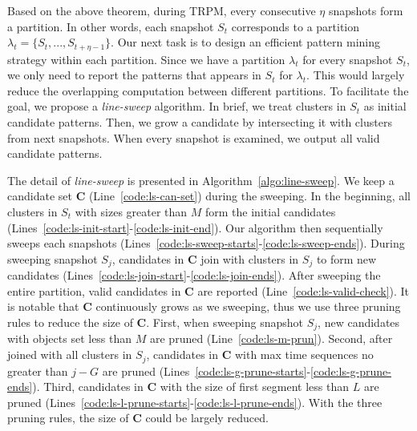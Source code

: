 Based on the above theorem, during TRPM, every consecutive $\eta$ snapshots
form a partition. In other words, each snapshot $S_t$ corresponds to a partition $\lambda_t=\{S_t,...,S_{t+\eta-1}\}$. 
Our next task is to design an efficient pattern mining strategy within each partition. 
Since we have a partition $\lambda_t$ for every snapshot $S_t$,
we only need to report the patterns that appears in $S_t$ for $\lambda_t$. This would largely
reduce the overlapping computation between different partitions. To facilitate the goal,
%
%
%
we propose a \emph{line-sweep} algorithm. In brief, we treat clusters in $S_t$ as initial candidate patterns.
Then, we grow a candidate by intersecting it with clusters from next snapshots. When every snapshot is examined,
we output all valid candidate patterns.

The detail of \emph{line-sweep} is presented in Algorithm~\ref{algo:line-sweep}. We keep a candidate set $\mathbf{C}$ (Line~\ref{code:ls-can-set}) during the sweeping. In the beginning, 
all clusters in $S_t$ with sizes greater than $M$ form the initial candidates (Lines~\ref{code:ls-init-start}-\ref{code:ls-init-end}). Our algorithm then sequentially sweeps each snapshots (Lines~\ref{code:ls-sweep-starts}-\ref{code:ls-sweep-ends}).
During sweeping snapshot $S_j$, candidates in $\mathbf{C}$ join with clusters in $S_j$ to form new candidates (Lines~\ref{code:ls-join-start}-\ref{code:ls-join-ends}). 
After sweeping the entire partition, valid candidates in $\mathbf{C}$
are reported (Line~\ref{code:ls-valid-check}). 
It is notable that $\mathbf{C}$ continuously grows as we sweeping, thus we use three pruning rules to reduce the size 
of $\mathbf{C}$. First, when sweeping snapshot $S_j$, new candidates with objects set less than $M$ are pruned (Line~\ref{code:ls-m-prun}). Second, after joined with all clusters in $S_j$, 
candidates in $\mathbf{C}$ with max time sequences no greater than $j-G$ are pruned (Lines~\ref{code:ls-g-prune-starts}-\ref{code:ls-g-prune-ends}). Third, candidates in $\mathbf{C}$ with the size of first segment less than $L$
are pruned (Lines~\ref{code:ls-l-prune-starts}-\ref{code:ls-l-prune-ends}). With the three pruning rules, the size
of $\mathbf{C}$ could be largely reduced.

